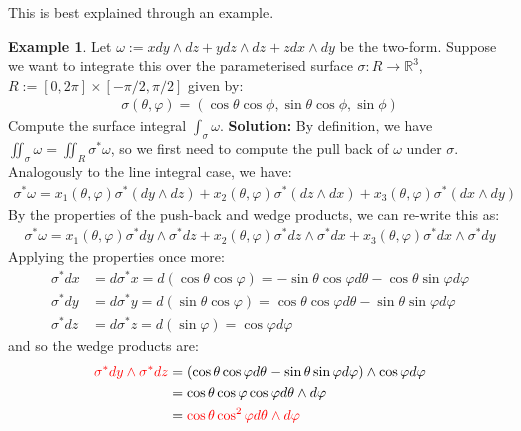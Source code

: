 \documentclass[11pt]{scrartcl}
\newcommand{\R}[0]{\mathbb{R}}
\theoremstyle{definition}
\newtheorem{ex}{Example}
\theoremstyle{remark}
\newcommand{\idx}[2]{\int_{#1}^{#2}}
\begin{document}
{This is best explained through an example. 

\begin{ex}
	Let $\omega := x dy \wedge dz + y dz \wedge dz + z dx \wedge dy$ be the two-form. Suppose we want to integrate this over the parameterised surface $\sigma: R \rightarrow \R^3$, $R:= [0, 2 \pi] \times [- \pi /2, \pi /2 ]$ given by: 
	\begin{align*}
		\sigma (\theta, \varphi) = ( \cos \theta \cos \phi, \sin \theta \cos \phi, \sin \phi ) 
	\end{align*}
	Compute the surface integral $\idx{\sigma}{} \omega$. 
	\newline
	\textbf{Solution:} By definition, we have $\iint_\sigma \omega = \iint_R \sigma^* \omega$, so we first need to compute the pull back of $\omega$ under $\sigma$. Analogously to the line integral case, we have: 
	\begin{align*}
		\sigma^* \omega = x_1(\theta, \varphi) \sigma^* (dy \wedge dz ) + x_2( \theta, \varphi) \sigma^*(dz \wedge dx) + x_3(\theta, \varphi) \sigma^*(dx \wedge dy)
	\end{align*}
	By the properties of the push-back and wedge products, we can re-write this as: 
	\begin{align*}
		\sigma^* \omega = x_1(\theta, \varphi) \sigma^* dy \wedge  \sigma^* dz  + x_2( \theta, \varphi) \sigma^*dz \wedge \sigma^* dx + x_3(\theta, \varphi) \sigma^* dx \wedge   \sigma^* dy		
	\end{align*}
	Applying the properties once more: 
	\begin{align*}
		\sigma^* dx & = d \sigma^* x = d( \cos \theta \cos \varphi) = - \sin \theta \cos \varphi d \theta - \cos \theta \sin \varphi d \varphi \\
		\sigma^* d y & = d \sigma^* y = d( \sin \theta \cos \varphi ) = \cos \theta \cos \varphi d \theta -  \sin \theta \sin \varphi d \varphi \\
		\sigma^* d z & = d \sigma^* z = d( \sin \varphi ) = \cos \varphi d \varphi 
	\end{align*}
	and so the wedge products are: 
	\begin{align*}
		\color{red} \sigma^* dy \wedge \sigma^* dz \color{black} & = ( \cos \theta \cos \varphi d \theta - \sin \theta \sin \varphi d \varphi ) \wedge \cos \varphi d \varphi  \\
		& = \cos \theta \cos \varphi \cos \varphi d \theta \wedge d \varphi \\
		& = \color{red} \cos \theta \cos^2 \varphi d \theta \wedge d \varphi \\

\end{align*}
\end{ex}}
\end{document}
